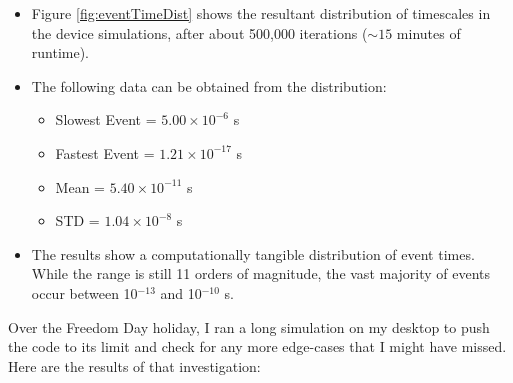 \documentclass[12pt]{article}
\begin{document}
\begin{itemize}
    \item{Figure \ref{fig:eventTimeDist} shows the resultant distribution of timescales in the device simulations, after about 500,000 iterations ($\sim 15$ minutes of runtime).}
    \item{The following data can be obtained from the distribution:
        \begin{itemize}
            \item{Slowest Event = $5.00 \times 10^{-6}$ s}
            \item{Fastest Event = $1.21 \times 10^{-17}$ s}
            \item{Mean = $5.40 \times 10^{-11}$ s}
            \item{STD = $1.04 \times 10^{-8}$ s}
        \end{itemize}
    }
\item{The results show a computationally tangible distribution of event times. While the range is still 11 orders of magnitude, the vast majority of events occur between 10$^{-13}$ and 10$^{-10}$ s.}
\end{itemize}

Over the Freedom Day holiday, I ran a long simulation on my desktop to push the code to its limit and check for any more edge-cases that I might have missed.
Here are the results of that investigation:
\end{document}
